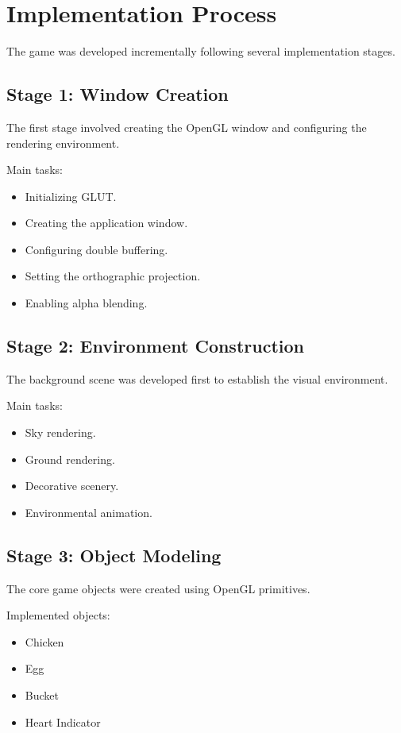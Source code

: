 \documentclass[12pt,a4paper]{report}
\begin{document}
\section{Implementation Process}

The game was developed incrementally following several implementation stages.

\subsection*{Stage 1: Window Creation}

The first stage involved creating the OpenGL window and configuring the rendering environment.

Main tasks:

\begin{itemize}
\item Initializing GLUT.
\item Creating the application window.
\item Configuring double buffering.
\item Setting the orthographic projection.
\item Enabling alpha blending.
\end{itemize}

\subsection*{Stage 2: Environment Construction}

The background scene was developed first to establish the visual environment.

Main tasks:

\begin{itemize}
\item Sky rendering.
\item Ground rendering.
\item Decorative scenery.
\item Environmental animation.
\end{itemize}

\subsection*{Stage 3: Object Modeling}

The core game objects were created using OpenGL primitives.

Implemented objects:

\begin{itemize}
\item Chicken
\item Egg
\item Bucket
\item Heart Indicator
\end{itemize}
\end{document}
